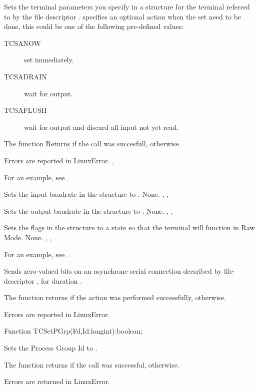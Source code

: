 { 
  Sets the terminal parameters you specify in a  structure
 for the terminal
  referred to by the file descriptor .  specifies an 
  optional action when the set need to be done,
  this could be one of the following pre-defined values:
 \begin{description}
\item [TCSANOW\ ] set immediately.
\item [TCSADRAIN\ ] wait for output.
\item [TCSAFLUSH\ ] wait for output and discard all input not yet read. 
\end{description}
The function Returns  if the call was succesfull,  
otherwise.
}
{Errors are reported in LinuxError.}
{, }

For an example, see .

{ 
  Sets the input baudrate in the  structure  to 
  .
}
{None.}
{, , }

{ 
  Sets the output baudrate in the  structure  to
  .
}
{None.}
{, , }

{ 
  Sets the flags in the  structure  to a state so that 
  the terminal will function in Raw Mode.
}
{None.}
{ , , }

For an example, see .

{  
  Sends zero-valued bits on an asynchrone serial connection decsribed by
  file-descriptor , for duration .

  The function returns  if the action was performed successfully,
 otherwise.
}
{Errors are reported in LinuxError.}
{}

Function TCSetPGrp(Fd,Id:longint):boolean;
{ 
  Sets the Process Group Id to . 

  The function returns  if the call was successful, 
otherwise.
}
{Errors are returned in LinuxError.}
{}

